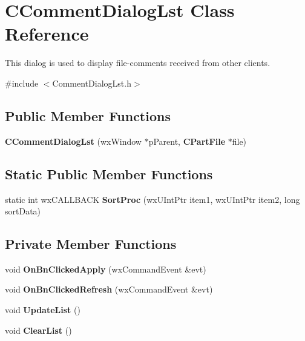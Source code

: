 \section{CCommentDialogLst Class Reference}
\label{classCCommentDialogLst}


This dialog is used to display file-\/comments received from other clients.  


{\ttfamily \#include $<$CommentDialogLst.h$>$}\subsection*{Public Member Functions}
\begin{DoxyCompactItemize}
\item 
{\bfseries CCommentDialogLst} (wxWindow $\ast$pParent, {\bf CPartFile} $\ast$file)\label{classCCommentDialogLst_a480b5702e7f72bd8055573600bdcfece}

\end{DoxyCompactItemize}
\subsection*{Static Public Member Functions}
\begin{DoxyCompactItemize}
\item 
static int wxCALLBACK {\bf SortProc} (wxUIntPtr item1, wxUIntPtr item2, long sortData)\label{classCCommentDialogLst_afeb0e0fd743b30176c828f938213242b}

\end{DoxyCompactItemize}
\subsection*{Private Member Functions}
\begin{DoxyCompactItemize}
\item 
void {\bfseries OnBnClickedApply} (wxCommandEvent \&evt)\label{classCCommentDialogLst_a1922b9f029ad9b160ed49965a0a7864d}

\item 
void {\bfseries OnBnClickedRefresh} (wxCommandEvent \&evt)\label{classCCommentDialogLst_a56ca08fb8da87c5a6d5df999aae65766}

\item 
void {\bf UpdateList} ()\label{classCCommentDialogLst_a8ff8198d2fa866e7c4441e873c2c3bbf}

\item 
void {\bf ClearList} ()\label{classCCommentDialogLst_a5b8c4e496a4daeefa37cb1018d00eacd}

\end{DoxyCompactItemize}
